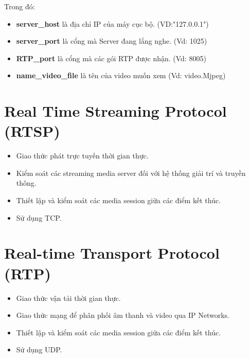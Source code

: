 \documentclass[a4paper]{article}
\begin{document}
\noindent Trong đó: \\
\begin{itemize}
    \item \textbf{server\_host} \tab là địa chỉ IP của máy cục bộ. (VD:"127.0.0.1")
    \item \textbf{server\_port} là cổng mà Server đang lắng nghe. (Vd: 1025)
    \item \textbf{RTP\_port} là cổng mà các gói RTP được nhận. (Vd: 8005)
    \item \textbf{name\_video\_file} là tên của video muốn xem (Vd: video.Mjpeg)
\end{itemize}

\section{Real Time Streaming Protocol (RTSP)}
\begin{itemize}
\item Giao thức phát trực tuyến thời gian thực.\\
\item Kiểm soát các streaming media server đối với hệ thống giải trí và truyền thông.\\
\item Thiết lập và kiểm soát các media session giữa các điểm kết thúc.\\
\item Sử dụng TCP.\\
\end{itemize}


\section{Real-time Transport Protocol (RTP)}
\begin{itemize}
\item Giao thức vận tải thời gian thực.\\
\item Giao thức mạng để phân phối âm thanh và video qua IP Networks.\\
\item Thiết lập và kiểm soát các media session giữa các điểm kết thúc.\\
\item Sử dụng UDP.\\
\end{itemize}


\end{document}
